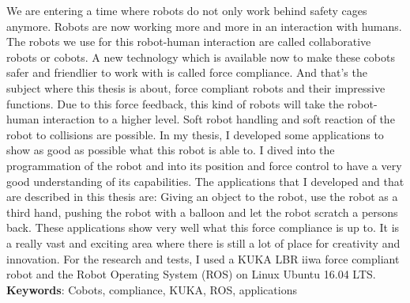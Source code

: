 We are entering a time where robots do not only work behind safety cages anymore. Robots are now working more and more in an interaction with humans. The robots we use for this robot-human interaction are called collaborative robots or cobots. A new technology which is available now to make these cobots safer and friendlier to work with is called force compliance. And that's the subject where this thesis is about, force compliant robots and their impressive functions. Due to this force feedback, this kind of robots will take the robot-human interaction to a higher level. Soft robot handling and soft reaction of the robot to collisions are possible. In my thesis, I developed some applications to show as good as possible what this robot is able to. I dived into the programmation of the robot and into its position and force control to have a very good understanding of its capabilities. The applications that I developed and that are described in this thesis are: Giving an object to the robot, use the robot as a third hand, pushing the robot with a balloon and let the robot scratch a persons back. These applications show very well what this force compliance is up to. It is a really vast and exciting area where there is still a lot of place for creativity and innovation. For the research and tests, I used a KUKA LBR iiwa force compliant robot and the Robot Operating System (ROS) on Linux Ubuntu 16.04 LTS.\\

\textbf{Keywords}: Cobots, compliance, KUKA, ROS, applications

